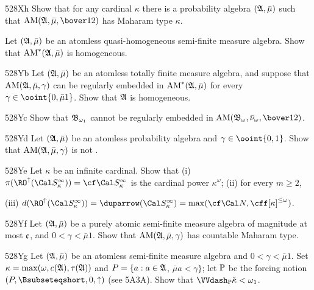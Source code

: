 {

\spheader 528Xh
Show that for any cardinal $\kappa$ there is a
probability algebra $(\frak A,\bar\mu)$ such that
$\AM(\frak A,\bar\mu,\bover12)$ has Maharam type $\kappa$.

Let $(\frak A,\bar\mu)$ be an atomless quasi-homogeneous
semi-finite measure algebra.   Show that
$\mathop{\text{AM}}^*(\frak A,\bar\mu)$ is homogeneous.

\spheader 528Yb Let $(\frak A,\bar\mu)$ be an atomless
totally finite
measure algebra, and suppose that $\mathop{\text{AM}}(\frak A,\bar\mu,\gamma)$ can be
regularly embedded in $\mathop{\text{AM}}^*(\frak A,\bar\mu)$ for every
$\gamma\in\ooint{0,\bar\mu 1}$.   Show that $\frak A$ is homogeneous.

\spheader 528Yc Show that $\frak B_{\omega_1}$ cannot
be regularly embedded in
$\AM(\frak B_{\omega},\bar\nu_{\omega},\bover12)$.

\spheader 528Yd
 Let $(\frak A,\bar\mu)$ be an atomless
probability algebra and $\gamma\in\ooint{0,1}$.   Show that
$\mathop{\text{AM}}(\frak A,\bar\mu,\gamma)$ is not \wsid.

\spheader 528Ye Let $\kappa$ be an infinite cardinal.   Show that
(i) $\pi(\RO^{\uparrow}(\Cal S_{\kappa}^{\infty}))
=\cf\Cal S_{\kappa}^{\infty}$
is the cardinal power $\kappa^{\omega}$;   (ii) for every $m\ge 2$,


\noindent (iii) $d(\RO^{\uparrow}(\Cal S_{\kappa}^{\infty}))
=\duparrow(\Cal S_{\kappa}^{\infty})
=\max(\cf\Cal N,\cff[\kappa]^{\le\omega})$.

\spheader 528Yf
Let $(\frak A,\bar\mu)$ be a purely atomic semi-finite
measure algebra of magnitude
at most $\frak c$, and $0<\gamma<\bar\mu 1$.   Show that
$\mathop{\text{AM}}(\frak A,\bar\mu,\gamma)$ has countable Maharam type.

\spheader 528Yg Let $(\frak A,\bar\mu)$ be an atomless
semi-finite measure algebra and $0<\gamma<\bar\mu 1$.   Set
$\kappa=\max(\omega,c(\frak A),\tau(\frak A))$ and
$P=\{a:a\in\frak A$, $\bar\mu a<\gamma\}$;  let $\Bbb P$ be the forcing
notion $(P,\Bsubseteqshort,0,\uparrow)$ (see 5A3A).   Show that
$\VVdash_{\Bbb P}\check\kappa<\omega_1$.

}

